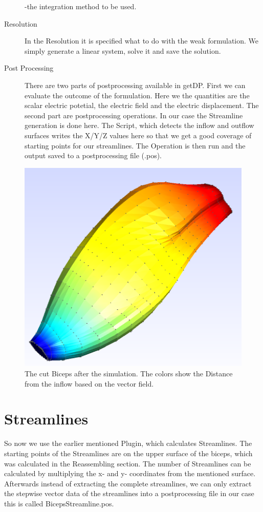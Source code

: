 \documentclass[preprint,journal]{vgtc}       %
\begin{document}
\begin{description}
	-the integration method to be used.\newline
	\item[Resolution]
	In the Resolution it is specified what to do with the weak formulation. We simply generate a linear system, solve it and save the solution.
	\item[Post Processing]
	There are two parts of postprocessing available in getDP. First we can evaluate the outcome of the formulation. Here we the quantities are the scalar electric potetial, the electric field and the electric displacement.
	The second part are postprocessing operations. In our case the Streamline generation is done here. The Script, which detects the inflow and outflow surfaces writes the X/Y/Z values here so that we get a good coverage of starting points for our streamlines. The Operation is then run and the output saved to a postprocessing file (.pos).
	\end{description}
\begin{figure}
	\begin{center}
		\includegraphics[width=.7\linewidth]{Sim.png}
	\end{center}
	\caption{The cut Biceps after the simulation. The colors show the Distance from the inflow based on the vector field.}
	\label{fig:sim}
\end{figure}
\section{Streamlines}
So now we use the earlier mentioned Plugin, which calculates Streamlines. The starting points of the Streamlines are on the upper surface of the biceps, which was calculated in the Reassembling section. The number of Streamlines can be calculated by multiplying the x- and y- coordinates from the mentioned surface. Afterwards instead of extracting the complete streamlines, we can only extract the stepwise vector data of the streamlines into a postprocessing file in our case this is called BicepsStreamline.pos.
\end{document}
